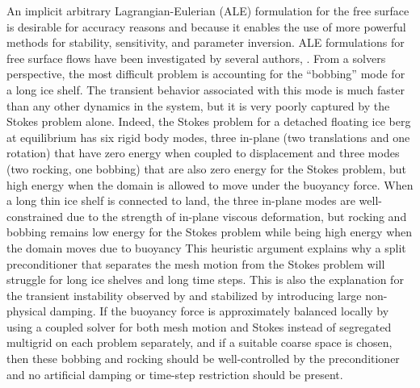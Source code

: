 An implicit arbitrary Lagrangian-Eulerian (ALE) formulation for the free surface is desirable for accuracy reasons and because it enables the use of more powerful methods for stability, sensitivity, and parameter inversion.
ALE formulations for free surface flows have been investigated by several authors, \citet[\eg]{braess2000arbitrary,walkley2004calculation,behr2004application,cairncross2000fem,baer2000fem}.
From a solvers perspective, the most difficult problem is accounting for the ``bobbing'' mode for a long ice shelf.
The transient behavior associated with this mode is much faster than any other dynamics in the system, but it is very poorly captured by the Stokes problem alone.
Indeed, the Stokes problem for a detached floating ice berg at equilibrium has six rigid body modes, three in-plane (two translations and one rotation) that have zero energy when coupled to displacement and three modes (two rocking, one bobbing) that are also zero energy for the Stokes problem, but high energy when the domain is allowed to move under the buoyancy force.
When a long thin ice shelf is connected to land, the three in-plane modes are well-constrained due to the strength of in-plane viscous deformation, but rocking and bobbing remains low energy for the Stokes problem while being high energy when the domain moves due to buoyancy
This heuristic argument explains why a split preconditioner that separates the mesh motion from the Stokes problem will struggle for long ice shelves and long time steps.
This is also the explanation for the transient instability observed by \citet{durand2009marine} and stabilized by introducing large non-physical damping.
If the buoyancy force is approximately balanced locally by using a coupled solver for both mesh motion and Stokes instead of segregated multigrid on each problem separately, and if a suitable coarse space is chosen, then these bobbing and rocking should be well-controlled by the preconditioner and no artificial damping or time-step restriction should be present.

